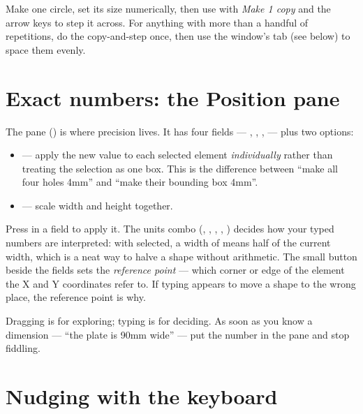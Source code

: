 \begin{tipbox}
Make one circle, set its size numerically, then use 
with \emph{Make 1 copy} and the arrow keys to step it across. For anything with
more than a handful of repetitions, do the copy-and-step once, then use the
 window's  tab (see below) to space them evenly.
\end{tipbox}

\section{Exact numbers: the Position pane}

The  pane () is where precision
lives. It has four fields --- , , ,  ---
plus two options:

\begin{itemize}
  \item {} --- apply the new value to each selected element
        \emph{individually} rather than treating the selection as one box. This
        is the difference between ``make all four holes 4\unit{mm}'' and ``make
        their bounding box 4\unit{mm}''.
  \item {} --- scale width and height together.
\end{itemize}

\noindent Press  in a field to apply it. The units combo
(, , , , \cmd{\%}) decides how your typed
numbers are interpreted: with \cmd{\%} selected, a width of  means half
of the current width, which is a neat way to halve a shape without arithmetic.
The small button beside the fields sets the \emph{reference point} --- which
corner or edge of the element the X and Y coordinates refer to. If typing
 appears to move a shape to the wrong place, the reference point is
why.

\begin{tipbox}
Dragging is for exploring; typing is for deciding. As soon as you know a
dimension --- ``the plate is 90\unit{mm} wide'' --- put the number in the
 pane and stop fiddling.
\end{tipbox}

\section{Nudging with the keyboard}


